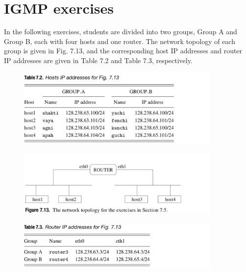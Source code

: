 \documentclass[10pt,a4paper]{article}
\numberwithin{equation}{section}
\numberwithin{figure}{section}
\numberwithin{table}{section}
\begin{document}
    \section*{IGMP exercises}
    In the following exercises, students are divided into two groups, Group A and Group B, each with four hosts and one router.
    The network topology of each group is given in Fig.
    7.13, and the corresponding host IP addresses and router IP addresses are given in Table 7.2 and Table 7.3, respectively.
    \begin{figure}[H]
        \centering
        \includegraphics[width=0.9\textwidth]{img/table7-2.png}
        \label{tbl:7.2}
    \end{figure}
    \begin{figure}[H]
        \centering
        \includegraphics[width=0.9\textwidth]{img/figure7-13.png}
        \label{fig:7.13}
    \end{figure}
    \begin{figure}[H]
        \centering
        \includegraphics[width=0.9\textwidth]{img/table7-3.png}
        \label{tbl:7.3}
    \end{figure}
\end{document}

